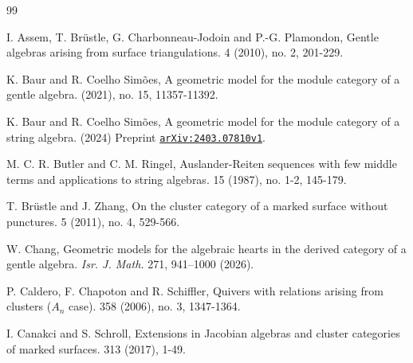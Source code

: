 \documentclass[11pt]{amsart}
\numberwithin{equation}{section}
\theoremstyle{definition}
\begin{document}
\begin{thebibliography}{99}

\newcommand{\au}[1]{\textrm{#1},}
\newcommand{\ti}[1]{\textrm{#1},}
\newcommand{\jo}[1]{\textit{#1}}
\newcommand{\vo}[1]{\textbf{#1}}
\newcommand{\yr}[1]{(#1)}
\newcommand{\pp}[2]{#1--#2.}
\newcommand{\arxiv}[1]{\href{http://arxiv.org/abs/#1}{arXiv:#1}}




I. Assem, T. Br\"ustle, G. Charbonneau-Jodoin and P.-G. Plamondon,
\newblock Gentle algebras arising from surface triangulations.
 4 (2010), no. 2, 201-229.



K. Baur and R. Coelho Sim\~oes,
\newblock A geometric model for the module category of a gentle algebra.
 (2021), no. 15, 11357-11392.

K. Baur and R. Coelho Sim\~oes,
\newblock A geometric model for the module category of a string algebra.
\newblock (2024) Preprint
\href{https://arxiv.org/abs/2403.07810v1}{\texttt{arXiv:2403.07810v1}}.



M. C. R. Butler and C. M. Ringel,
\newblock Auslander-Reiten sequences with few middle terms and applications to string algebras.
 15 (1987), no. 1-2, 145-179.


T. Br\"ustle and J. Zhang,
\newblock On the cluster category of a marked surface without punctures.
 5 (2011), no. 4, 529-566.

W. Chang,
\newblock Geometric models for the algebraic hearts in the derived category of a gentle algebra. \emph{Isr. J. Math.} 271, 941–1000 (2026). 

P. Caldero, F. Chapoton and R. Schiffler,
\newblock Quivers with relations arising from clusters ($A_n$ case).
 358 (2006), no. 3, 1347-1364.

I. Canakci and S. Schroll,
\newblock Extensions in Jacobian algebras and cluster categories of marked surfaces.
 313 (2017), 1-49.





\end{thebibliography}
\end{document}
